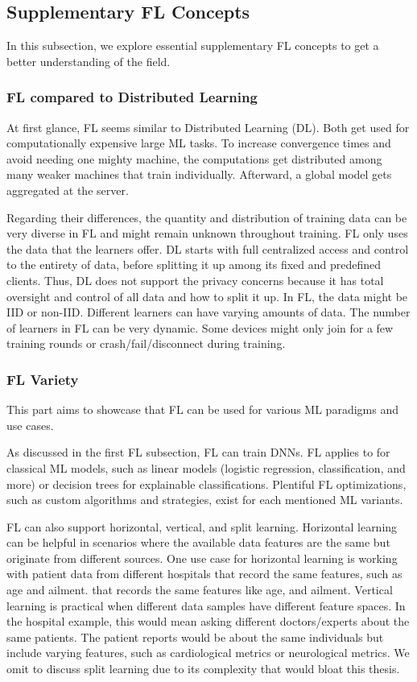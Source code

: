 \subsection{Supplementary FL Concepts}

In this subsection, we explore essential supplementary FL concepts
to get a better understanding of the field.

\subsubsection{FL compared to Distributed Learning}

At first glance, FL seems similar to Distributed Learning (DL).
Both get used for computationally expensive large ML tasks.
To increase convergence times and avoid needing one mighty machine,
the computations get distributed among many weaker machines that train individually.
Afterward, a global model gets aggregated
at the server.

Regarding their differences,
the quantity and distribution of training data can be very diverse in FL
and might remain unknown throughout training.
FL only uses the data that the learners offer. 
DL starts with full centralized access and control to the entirety of data,
before splitting it up among its fixed and predefined clients.
Thus, DL does not support the privacy concerns because it has total
oversight and control of all data and how to split it up.
In FL, the data might be IID or non-IID.
Different learners can have varying amounts of data.
The number of learners in FL can be very dynamic.
Some devices might only join for a few training rounds
or crash/fail/disconnect during training.

\subsubsection{FL Variety}

This part aims to showcase that FL can
be used for various ML paradigms and use cases.

As discussed in the first FL subsection, FL can train DNNs.
FL applies to for classical ML models, such as
linear models (logistic regression, classification, and more) or
decision trees for explainable classifications.
Plentiful FL optimizations, such as custom algorithms and strategies,
exist for each mentioned ML variants.

FL can also support horizontal, vertical, and split learning.
Horizontal learning can be helpful in scenarios where the available data features are the same but
originate from different sources.
One use case for horizontal learning is working with
patient data from different hospitals that record the same features,
such as age and ailment.
that records the same features like age, and ailment.
Vertical learning is practical when different data samples have
different feature spaces.
In the hospital example, this would mean asking different doctors/experts
about the same patients. 
The patient reports would be about the same individuals but include varying features,
such as cardiological metrics or neurological metrics.
We omit to discuss split learning due to its complexity that would bloat this thesis.

